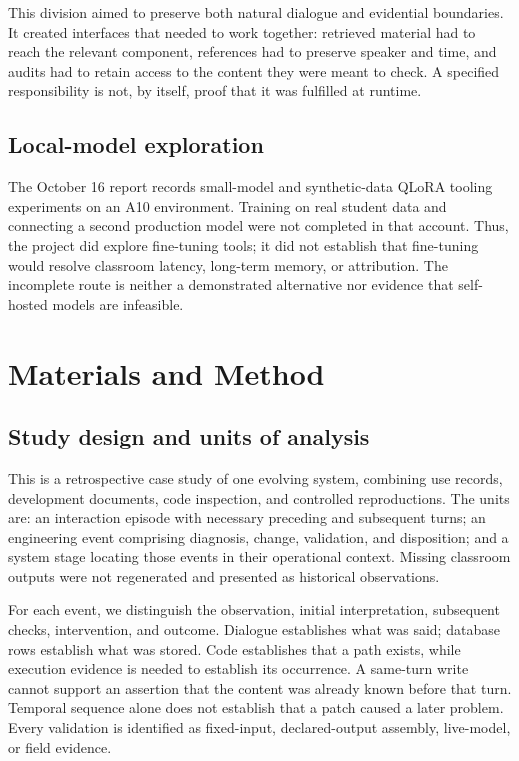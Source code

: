 \documentclass[11pt,a4paper]{article}
\begin{document}
This division aimed to preserve both natural dialogue and evidential boundaries. It created interfaces that needed to work together: retrieved material had to reach the relevant component, references had to preserve speaker and time, and audits had to retain access to the content they were meant to check. A specified responsibility is not, by itself, proof that it was fulfilled at runtime.

\subsection{Local-model exploration}
The October 16 report records small-model and synthetic-data QLoRA tooling experiments on an A10 environment. Training on real student data and connecting a second production model were not completed in that account. Thus, the project did explore fine-tuning tools; it did not establish that fine-tuning would resolve classroom latency, long-term memory, or attribution. The incomplete route is neither a demonstrated alternative nor evidence that self-hosted models are infeasible.

\section{Materials and Method}
\subsection{Study design and units of analysis}
This is a retrospective case study of one evolving system, combining use records, development documents, code inspection, and controlled reproductions. The units are: an interaction episode with necessary preceding and subsequent turns; an engineering event comprising diagnosis, change, validation, and disposition; and a system stage locating those events in their operational context. Missing classroom outputs were not regenerated and presented as historical observations.

For each event, we distinguish the observation, initial interpretation, subsequent checks, intervention, and outcome. Dialogue establishes what was said; database rows establish what was stored. Code establishes that a path exists, while execution evidence is needed to establish its occurrence. A same-turn write cannot support an assertion that the content was already known before that turn. Temporal sequence alone does not establish that a patch caused a later problem. Every validation is identified as fixed-input, declared-output assembly, live-model, or field evidence.
\end{document}
